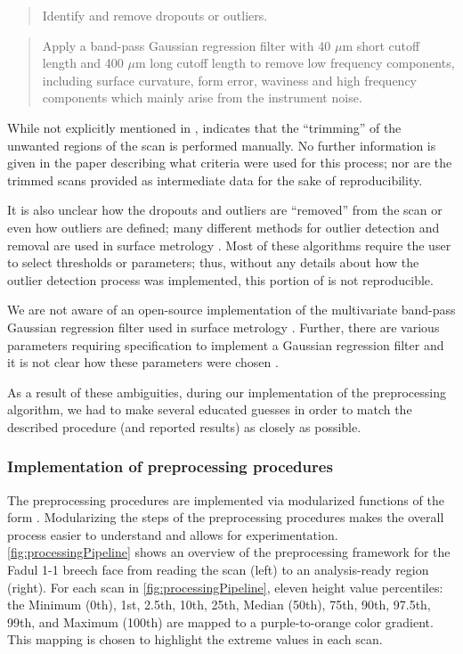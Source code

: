 \begin{quote}
Identify and remove dropouts or outliers.
\end{quote}

\begin{quote}
Apply a band-pass Gaussian regression filter with 40 \(\mu\)m short
cutoff length and 400 \(\mu\)m long cutoff length to remove low
frequency components, including surface curvature, form error, waviness
and high frequency components which mainly arise from the instrument
noise.
\end{quote}

While not explicitly mentioned in \citet{song_3d_2014},
\citet{song_estimating_2018} indicates that the ``trimming'' of the
unwanted regions of the scan is performed manually. No further
information is given in the paper describing what criteria were used for
this process; nor are the trimmed scans provided as intermediate data
for the sake of reproducibility.

It is also unclear how the dropouts and outliers are ``removed'' from
the scan or even how outliers are defined; many different methods for
outlier detection and removal are used in surface metrology
\citep{outlierdetection}. Most of these algorithms require the user to
select thresholds or parameters; thus, without any details about how the
outlier detection process was implemented, this portion of
\citet{song_3d_2014} is not reproducible.

We are not aware of an open-source implementation of the multivariate
band-pass Gaussian regression filter used in surface metrology
\citep{ISO16610-71}. Further, there are various parameters requiring
specification to implement a Gaussian regression filter and it is not
clear how these parameters were chosen
\citep{brinkman_bodschwinna_2003}.

As a result of these ambiguities, during our implementation of the
preprocessing algorithm, we had to make several educated guesses in
order to match the described procedure (and reported results) as closely
as possible.

\hypertarget{implementation-of-preprocessing-procedures}{%
\subsubsection{Implementation of preprocessing
procedures}\label{implementation-of-preprocessing-procedures}}

The preprocessing procedures are implemented via modularized functions
of the form . Modularizing the steps of the
preprocessing procedures makes the overall process easier to understand
and allows for experimentation. \autoref{fig:processingPipeline} shows
an overview of the preprocessing framework for the Fadul 1-1 breech face
from reading the scan (left) to an analysis-ready region (right). For
each scan in \autoref{fig:processingPipeline}, eleven height value
percentiles: the Minimum (0th), 1st, 2.5th, 10th, 25th, Median (50th),
75th, 90th, 97.5th, 99th, and Maximum (100th) are mapped to a
purple-to-orange color gradient. This mapping is chosen to highlight the
extreme values in each scan.

